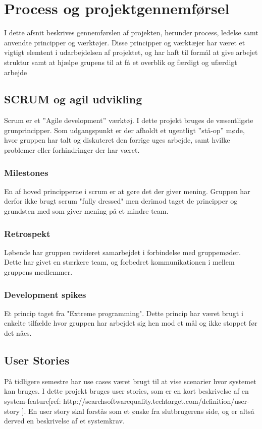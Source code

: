 \chapter{Process og projektgennemførsel}

I dette afsnit beskrives gennemførslen af projekten, herunder process, ledelse samt anvendte principper og værktøjer. Disse principper og værktæjer har været et vigtigt elemtent i udarbejdelsen af projektet, og har haft til formål at give arbejet struktur samt at hjælpe grupens til at få et overblik og færdigt og ufærdigt arbejde

\section{SCRUM og agil udvikling}
Scrum er et ”Agile development” værktøj. I dette projekt bruges de væsentligste grunprincipper. Som udgangspunkt er der afholdt et ugentligt ”stå-op” møde, hvor gruppen har talt og diskuteret den forrige uges arbejde, samt hvilke problemer eller forhindringer der har været.

\subsection{Milestones}
En af hoved principperne i scrum er at gøre det der giver mening. Gruppen har derfor ikke brugt scrum "fully dressed" men derimod taget de principper og grundsten med som giver mening på et mindre team.

\subsection{Retrospekt}
Løbende har gruppen revideret samarbejdet i forbindelse med gruppemøder. Dette har givet en stærkere team, og forbedret kommunikationen i mellem gruppens medlemmer.

\subsection{Development spikes}
Et princip taget fra "Extreme programming". Dette princip har været brugt i enkelte tilfælde hvor gruppen har arbejdet sig hen mod et mål og ikke stoppet før det nåes.

\section{User Stories}
På tidligere semestre har use cases været brugt til at vise scenarier hvor systemet kan bruges. I dette projekt bruges user stories, som er en kort beskrivelse af en system-feature[ref: http://searchsoftwarequality.techtarget.com/definition/user-story ]. En user story skal forstås som et ønske fra slutbrugerens side, og er altså derved en beskrivelse af et systemkrav.

